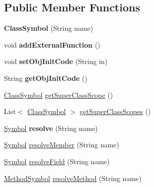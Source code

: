 \subsection*{Public Member Functions}
\begin{DoxyCompactItemize}
\item 
\mbox{\label{classlime_1_1antlr4_1_1ClassSymbol_a2aca5ee207d7ea16740b505a0e9409f6}} 
{\bfseries Class\+Symbol} (String name)
\item 
\mbox{\label{classlime_1_1antlr4_1_1ClassSymbol_ab9deb43e9c146c98c8f988f8eda8ab4a}} 
void {\bfseries add\+External\+Function} ()
\item 
\mbox{\label{classlime_1_1antlr4_1_1ClassSymbol_a50068ed8eba46e8e4d59305b69649f52}} 
void {\bfseries set\+Obj\+Init\+Code} (String in)
\item 
\mbox{\label{classlime_1_1antlr4_1_1ClassSymbol_a79ea5e2f896c15184664d53f2b96c0c4}} 
String {\bfseries get\+Obj\+Init\+Code} ()
\item 
\hyperlink{classlime_1_1antlr4_1_1ClassSymbol}{Class\+Symbol} \hyperlink{classlime_1_1antlr4_1_1ClassSymbol_a9f660dd54d7ab8643fb885669adad106}{get\+Super\+Class\+Scope} ()
\item 
List$<$ \hyperlink{classlime_1_1antlr4_1_1ClassSymbol}{Class\+Symbol} $>$ \hyperlink{classlime_1_1antlr4_1_1ClassSymbol_a6505cf7d9bbc2b32620eab9e20ddb881}{get\+Super\+Class\+Scopes} ()
\item 
\mbox{\label{classlime_1_1antlr4_1_1ClassSymbol_ae4de50f9edf4a6aff80835352e9a8039}} 
\hyperlink{interfacelime_1_1antlr4_1_1Symbol}{Symbol} {\bfseries resolve} (String name)
\item 
\hyperlink{interfacelime_1_1antlr4_1_1Symbol}{Symbol} \hyperlink{classlime_1_1antlr4_1_1ClassSymbol_a6bf9bcc8721faa0f5c61b9134e8ddf37}{resolve\+Member} (String name)
\item 
\hyperlink{interfacelime_1_1antlr4_1_1Symbol}{Symbol} \hyperlink{classlime_1_1antlr4_1_1ClassSymbol_a3b5e6abcf9e0c8be368f0aa77f58db1e}{resolve\+Field} (String name)
\item 
\hyperlink{classlime_1_1antlr4_1_1MethodSymbol}{Method\+Symbol} \hyperlink{classlime_1_1antlr4_1_1ClassSymbol_a8b22f82d150b8c2fce1330ce7e570bb9}{resolve\+Method} (String name)

\end{DoxyCompactItemize}
